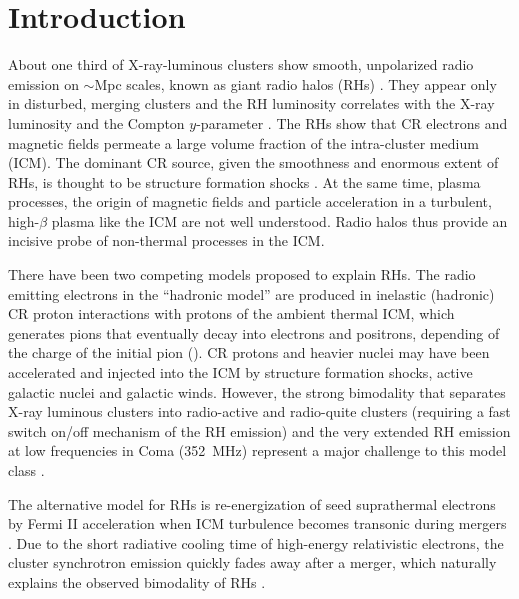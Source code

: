 \documentclass[fleqn,usenatbib,useAMS]{mnras}
\begin{document}
\section{Introduction}
About one third of X-ray-luminous clusters show smooth, unpolarized
radio emission on $\sim$Mpc scales, known as giant radio halos (RHs)
\citep{2014IJMPD..2330007B}. They appear only in disturbed, merging
clusters and the RH luminosity correlates with the X-ray luminosity
\citep{2001A&A...369..441G,2012A&ARv..20...54F} and the Compton
$y$-parameter \citep{2012MNRAS.421L.112B,2013A&A...554A.140P}. The RHs
show that CR electrons and magnetic fields permeate a large volume
fraction of the intra-cluster medium (ICM). The dominant CR source,
given the smoothness and enormous extent of RHs, is thought to be
structure formation shocks \citep{miniati01,pfrommer08}. At the same
time, plasma processes, the origin of magnetic fields and particle
acceleration in a turbulent, high-$\beta$ plasma like the ICM are not
well understood. Radio halos thus provide an incisive probe of
non-thermal processes in the ICM.

There have been two competing models proposed to explain RHs.  The
radio emitting electrons in the ``hadronic model'' are produced in
inelastic (hadronic) CR proton interactions with protons of the
ambient thermal ICM, which generates pions that eventually decay into
electrons and positrons, depending of the charge of the initial pion
(\citealp{1980ApJ...239L..93D,1999APh....12..169B,2001ApJ...562..233M,
  2004A&A...413...17P,2008MNRAS.385.1211P,ensslin11}). CR protons and
heavier nuclei may have been accelerated and injected into the ICM by
structure formation shocks, active galactic nuclei and galactic
winds. However, the strong bimodality that separates X-ray luminous
clusters into radio-active and radio-quite clusters (requiring a
fast switch on/off mechanism of the RH emission) and the very extended
RH emission at low frequencies in Coma (352~MHz) represent a major
challenge to this model class \citep{brunetti12,2014MNRAS.438..124Z}.

The alternative model for RHs is re-energization of seed suprathermal
electrons by Fermi II acceleration when ICM turbulence becomes
transonic during mergers
\citep{1987A&A...182...21S,1993ApJ...406..399G,2001MNRAS.320..365B,
  2004MNRAS.350.1174B,brunetti07,brunetti11,miniati15}. Due
to the short radiative cooling time of high-energy relativistic
electrons, the cluster synchrotron emission quickly fades away after a
merger, which naturally explains the observed bimodality of RHs
\cite[see e.g.][]{2013MNRAS.429.3564D,2014MNRAS.443.3564D}.
\end{document}
